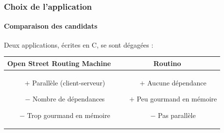 \begin{frame}
  \frametitle{Choix de l'application}
  \framesubtitle{Comparaison des candidats}
  \begin{block}{}
    Deux applications, écrites en C, se sont dégagées :
  \end{block}
  \begin{tabular}{c|c}
    \textbf{Open Street Routing Machine} & \textbf{Routino} \\
    \hline
    \begin{minipage}{5cm}
      \vspace{1em}
      \begin{itemize}
      \item[$+$] Parallèle (client-serveur)
        \vspace{1em}
      \item[$-$] Nombre de dépendances
        \vspace{1em}
      \item[$-$] Trop gourmand en mémoire
      \end{itemize}
    \end{minipage}
    &
    \begin{minipage}{5cm}
      \vspace{1em}
      \begin{itemize}
      \item[$+$] Aucune dépendance
        \vspace{1em}
      \item[$+$] Peu gourmand en mémoire
        \vspace{1em}
      \item[$-$] Pas parallèle
      \end{itemize}
    \end{minipage}
  \end{tabular}
\end{frame}

